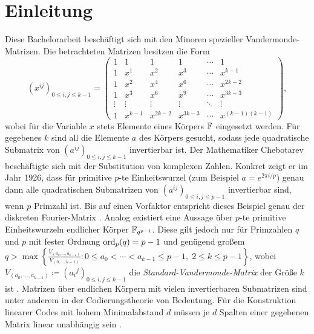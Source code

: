 \section{Einleitung}

Diese Bachelorarbeit beschäftigt sich mit den Minoren spezieller Vandermonde-Matrizen. Die betrachteten Matrizen besitzen die Form \begin{equation*}
    \left( x^{ij} \right)_{0\leq i,j \leq k-1} = \begin{pmatrix}
        1     & 1    & 1    & 1    &\cdots& 1 \\
        1     & x^1  & x^2  & x^3  &\cdots& x^{k-1} \\
        1     & x^2  & x^4  & x^6  &\cdots& x^{2k-2} \\
        1     & x^3  & x^6  & x^9  &\cdots& x^{3k-3} \\
        \vdots&\vdots&\vdots&\vdots&\ddots&\vdots \\
        1     &x^{k-1}&x^{2k-2}&x^{3k-3}&\cdots&x^{(k-1)(k-1)}
    \end{pmatrix},
\end{equation*}
wobei für die Variable $x$ stets Elemente eines Körpers $\field{}$ eingesetzt werden. Für gegebenes $k$ sind all die Elemente $a$ des Körpers gesucht, sodass jede quadratische Submatrix von $\left( a^{ij} \right)_{0\leq i,j \leq k-1}$ invertierbar ist. Der Mathematiker Chebotarev beschäftigte sich mit der Substitution von komplexen Zahlen. Konkret zeigt er im Jahr 1926, dass für primitive $p$-te Einheitswurzel (zum Beispiel $a=e^{2\pi i/p}$) genau dann alle quadratischen Submatrizen von $\left( a^{ij} \right)_{0\leq i,j \leq p-1}$ invertierbar sind, wenn $p$ Primzahl ist. Bis auf einen Vorfaktor entspricht dieses Beispiel genau der diskreten Fourier-Matrix \cite{CheboProof}. Analog existiert eine Aussage über $p$-te primitive Einheitswurzeln endlicher Körper $\field{q}[p-1]$. Diese gilt jedoch nur für Primzahlen $q$ und $p$ mit fester Ordnung $\ord{q}[p] = p-1$ und genügend großem $q> \max\left\{\frac{V_{(a_0,\dots,a_{k-1})}}{V_{(0,\dots,k-1)}} : 0\leq a_0 < \cdots < a_{k-1} \leq p-1,\; 2\leq k \leq p-1 \right\}$, wobei $V_{(a_0,\dots,a_{k-1})} \coloneqq ({a_i}^j)_{0\leq i,j \leq k-1}$ die \emph{Standard-Vandermonde-Matrix} der Größe $k$ ist \cite{CheboFiniteFields}. Matrizen über endlichen Körpern mit vielen invertierbaren Submatrizen sind unter anderem in der Codierungstheorie von Bedeutung. Für die Konstruktion linearer Codes mit hohem Minimalabstand $d$ müssen je $d$ Spalten einer gegebenen Matrix linear unabhängig sein \cite{CodingTheory}. 

